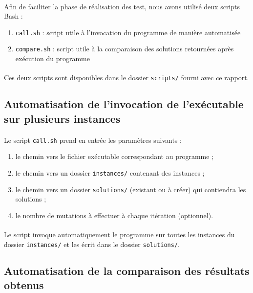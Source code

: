 \paragraph{}
Afin de faciliter la phase de réalisation des test, nous avons utilisé deux scripts Bash :
\begin{enumerate}
\item \texttt{call.sh} : script utile à l'invocation du programme de manière automatisée
\item \texttt{compare.sh} : script utile à la comparaison des solutions retournées après exécution du programme
\end{enumerate}
\paragraph{}
Ces deux scripts sont disponibles dans le dossier \texttt{scripts/} fourni avec ce rapport.

\subsection{Automatisation de l'invocation de l'exécutable sur plusieurs instances}

\paragraph{}
Le script \texttt{call.sh} prend en entrée les paramètres suivants :
\begin{enumerate}
\item le chemin vers le fichier exécutable correspondant au programme ;
\item le chemin vers un dossier \texttt{instances/} contenant des instances ;
\item le chemin vers un dossier \texttt{solutions/} (existant ou à créer) qui contiendra les solutions ;
\item le nombre de mutations à effectuer à chaque itération (optionnel).
\end{enumerate}
\paragraph{}
Le script invoque automatiquement le programme sur toutes les instances du dossier \texttt{instances/} et les écrit dans le dossier \texttt{solutions/}.

\subsection{Automatisation de la comparaison des résultats obtenus}


